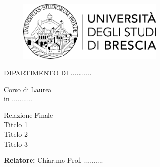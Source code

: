 \begin{titlepage}
    \begin{center}
        
        \begin{figure}[t]
            \centering
            \includegraphics[width=72.4mm,height=30mm]{logo_unibs.png}    
        \end{figure}

        \vspace*{10mm}
        
        {\fontsize{17}{17}\selectfont
            DIPARTIMENTO DI ...........\\
        }

        \vspace*{10mm}

        {\fontsize{17}{17}\selectfont
            Corso di Laurea\\
            in ...........\\

        }    
        
        \vspace*{20mm}

        {\fontsize{20}{20}\selectfont 
            Relazione Finale\\
            Titolo 1\\
            Titolo 2\\
            Titolo 3\\
        }

    \end{center}

    \vfill

    \begin{flushleft}
        {\fontsize{17}{17}\selectfont 
            \textbf{Relatore:} Chiar.mo Prof. ..........
        }
        
    \end{flushleft}


\end{titlepage}
